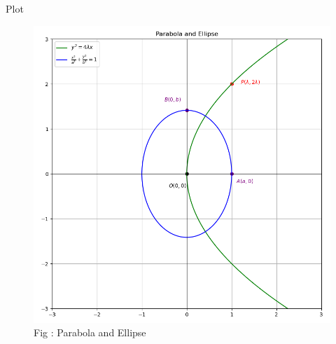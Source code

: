 \documentclass{beamer}
\numberwithin{equation}{section}
\theoremstyle{remark}
\begin{document}
\begin{frame}{Plot}

\begin{figure}[h!]
  \centering
  \includegraphics[width=0.6\columnwidth]{figs/parabola_ellipse.png} 
   \caption*{Fig : Parabola and Ellipse}
  \label{Fig1}
\end{figure}

\end{frame}
\end{document}
